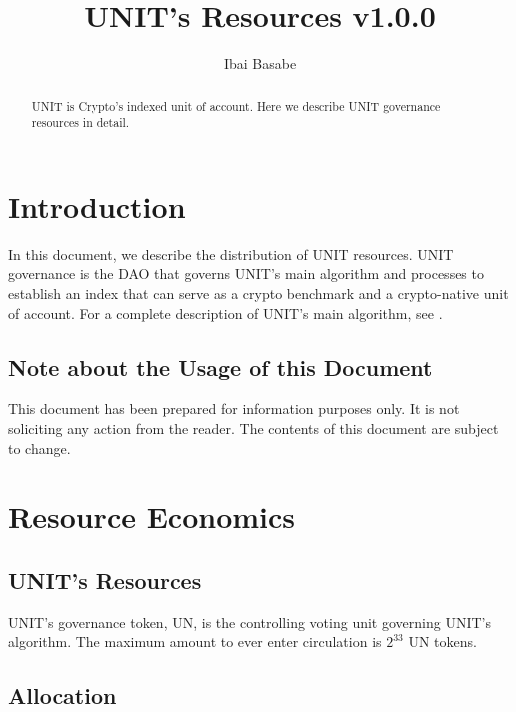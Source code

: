 \documentclass[12pt]{article}
\title{UNIT’s Resources v1.0.0}
\author{Ibai Basabe}
\date{}           %
\begin{document}
\pagecolor{white}

\maketitle

\begin{abstract}

UNIT is Crypto’s indexed unit of account. Here we describe UNIT governance resources in detail.

\end{abstract}

\tableofcontents
\newpage



\section{Introduction}

In this document, we describe the distribution of UNIT resources. UNIT governance is the DAO that governs UNIT’s main algorithm and processes to establish an index that can serve as a crypto benchmark and a crypto-native unit of account. For a complete description of UNIT’s main algorithm, see \cite{B1}.

\subsection{Note about the Usage of this Document}

This document has been prepared for information purposes only. It is not soliciting any action from the reader. The contents of this document are subject to change.


\section{Resource Economics}

\subsection{UNIT's Resources}

UNIT’s governance token, UN, is the controlling voting unit governing UNIT’s algorithm. The maximum amount to ever enter circulation is $2^{33}$ UN tokens.





\newpage

\subsection{Allocation}
\end{document}
